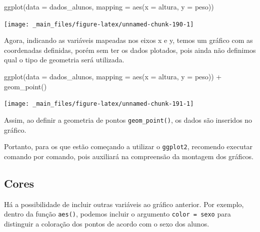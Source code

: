 \documentclass[
  brazilian,
]{book}
\newenvironment{Shaded}{\begin{snugshade}}{\end{snugshade}}
\newcommand{\AttributeTok}[1]{\textcolor[rgb]{0.77,0.63,0.00}{#1}}
\newcommand{\FunctionTok}[1]{\textcolor[rgb]{0.00,0.00,0.00}{#1}}
\newcommand{\NormalTok}[1]{#1}
\newcommand{\SpecialCharTok}[1]{\textcolor[rgb]{0.00,0.00,0.00}{#1}}
\begin{document}
\begin{Shaded}
\begin{Highlighting}[]
\FunctionTok{ggplot}\NormalTok{(}\AttributeTok{data =}\NormalTok{ dados\_alunos,}
       \AttributeTok{mapping =} \FunctionTok{aes}\NormalTok{(}\AttributeTok{x =}\NormalTok{ altura, }
                     \AttributeTok{y =}\NormalTok{ peso))}
\end{Highlighting}
\end{Shaded}

\begin{center}\texttt{[image: \_main\_files/figure-latex/unnamed-chunk-190-1]} \end{center}

Agora, indicando as variáveis mapeadas nos eixos x e y, temos um gráfico com as coordenadas definidas, porém sem ter os dados plotados, pois ainda não definimos qual o tipo de geometria será utilizada.

\begin{Shaded}
\begin{Highlighting}[]
\FunctionTok{ggplot}\NormalTok{(}\AttributeTok{data =}\NormalTok{ dados\_alunos,}
       \AttributeTok{mapping =} \FunctionTok{aes}\NormalTok{(}\AttributeTok{x =}\NormalTok{ altura,}
                     \AttributeTok{y =}\NormalTok{ peso)) }\SpecialCharTok{+}
  \FunctionTok{geom\_point}\NormalTok{()}
\end{Highlighting}
\end{Shaded}

\begin{center}\texttt{[image: \_main\_files/figure-latex/unnamed-chunk-191-1]} \end{center}

Assim, ao definir a geometria de pontos \texttt{geom\_point()}, os dados são inseridos no gráfico.

Portanto, para os que estão começando a utilizar o \texttt{ggplot2}, recomendo executar comando por comando, pois auxiliará na compreensão da montagem dos gráficos.

\hypertarget{cores}{%
\subsection{Cores}\label{cores}}

Há a possibilidade de incluir outras variáveis ao gráfico anterior. Por exemplo, dentro da função \texttt{aes()}, podemos incluir o argumento \texttt{color\ =\ sexo} para distinguir a coloração dos pontos de acordo com o sexo dos alunos.
\end{document}
